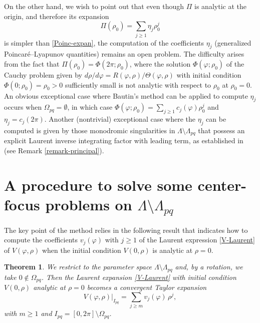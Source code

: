 \documentclass[12pt]{amsart}
\newtheorem {theorem} {Theorem}%
\begin{document}
On the other hand, we wish to point out that even though $\Pi$ is analytic at the origin, and therefore its expansion
\begin{equation}\label{Poinc-analytic}
\Pi(\rho_0) = \sum_{j\geq 1} \eta_j \rho_0^j
\end{equation}
is simpler than \eqref{Poinc-expan}, the computation of the coefficients $\eta_j$ (generalized Poincar\'e--Lyapunov quantities) remains an open problem. The difficulty arises from the fact that $\Pi(\rho_0) = \Phi(2 \pi; \rho_0)$, where the solution $\Phi(\varphi; \rho_0)$ of the Cauchy problem given by $d \rho / d \varphi = R(\varphi, \rho)/\Theta(\varphi, \rho)$ with initial condition $\Phi(0; \rho_0) = \rho_0 > 0$ sufficiently small is not analytic with respect to $\rho_0$ at $\rho_0 = 0$. An obvious exceptional case where Bautin's method can be applied to compute $\eta_j$ occurs when $\Omega_{pq} = \emptyset$, in which case $\Phi(\varphi; \rho_0) = \sum_{j\geq 1} c_j(\varphi) \rho_0^j$ and $\eta_j = c_j(2 \pi)$. Another (nontrivial) exceptional case where the $\eta_j$ can be computed is given by those monodromic singularities in $\Lambda \setminus \Lambda_{pq}$ that possess an explicit Laurent inverse integrating factor with leading term, as established in \cite{GaGi4} (see Remark \ref{remark-principal}).

\section{A procedure to solve some center-focus problems on $\Lambda \setminus \Lambda_{pq}$}

The key point of the method relies in the following result that indicates how to compute the coefficients $v_j(\varphi)$ with $j \geq 1$ of the Laurent expression  \eqref{V-Laurent} of $V(\varphi, \rho)$ when the initial condition $V(0, \rho)$ is analytic at $\rho=0$.

\begin{theorem} \label{teo-Pi-Algorithm}
We restrict to the parameter space $\Lambda \setminus \Lambda_{pq}$ and, by a rotation, we take $0 \not\in \Omega_{pq}$. Then the Laurent expansion \eqref{V-Laurent} with initial condition $V(0, \rho)$ analytic at $\rho=0$ becomes a convergent Taylor expansion
\begin{equation}\label{Taylor-V}
V(\varphi, \rho) \Big|_{I_{pq}} = \sum_{j \ge m} v_j(\varphi) \, \rho^j,
\end{equation}
with $m \geq 1$ and $I_{pq} = [0, 2 \pi] \setminus \Omega_{pq}$.
\end{theorem}
\end{document}

